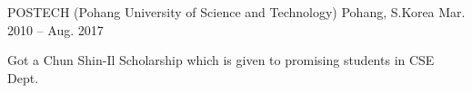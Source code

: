 

\begin{cventries}

	{POSTECH (Pohang University of Science and Technology)} %
	{Pohang, S.Korea} %
	{Mar. 2010 -- Aug. 2017} %
	{
		\begin{cvitems} %
			\item {Got a Chun Shin-Il Scholarship which is given to promising students in CSE Dept.}
		\end{cvitems}
	}

\end{cventries}
